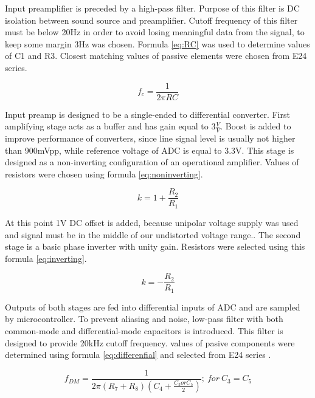\documentclass[a4paper,twoside,12pt]{book}
\begin{document}
Input preamplifier is preceded by a high-pass filter.
Purpose of this filter is DC isolation between sound source and preamplifier.
Cutoff frequency of this filter must be below 20Hz
in order to avoid losing meaningful data from the signal,
to keep some margin 3Hz was chosen.
Formula \ref{eq:RC} was used to determine values of C1 and R3.
Closest matching values of passive elements were chosen from E24 series.

\begin{equation}\label{eq:RC}
f_c = \frac{1}{2 \pi RC}
\end{equation}

Input preamp is designed to be a single-ended to differential converter.
First amplifying stage acts as a buffer and has gain equal to \(3\frac{V}{V}\).
Boost is added to improve performance of converters,
since line signal level is usually not higher than 900mVpp,
while reference voltage of ADC is equal to 3.3V.
This stage is designed as a non-inverting configuration of an operational amplifier.
Values of resistors were chosen using formula \ref{eq:noninverting}.

\begin{equation}\label{eq:noninverting}
k = 1+\frac{R_2}{R_1}
\end{equation}

At this point 1V DC offset is added, because unipolar voltage supply was used
and signal must be in the middle of our undistorted voltage range..
The second stage is a basic phase inverter with unity gain.
Resistors were selected using this formula \ref{eq:inverting}.

\begin{equation}\label{eq:inverting}
k = -\frac{R_2}{R_1}
\end{equation}

Outputs of both stages are fed into differential inputs of ADC
and are sampled by microcontroller.
To prevent aliasing and noise,
low-pass filter with both common-mode and differential-mode capacitors
is introduced. This filter is designed to provide 20kHz cutoff frequency.
values of pasive components were determined using formula \ref{eq:differenfial}
and selected from E24 series
\cite{aliasing}.

\begin{equation}\label{eq:differenfial}
f_{DM} = \frac{1}{2 \pi (R_7 + R_8)(C_4 + \frac{C_3 or C_5}{2})};\ for \ C_3 = C_5
\end{equation}
\end{document}
